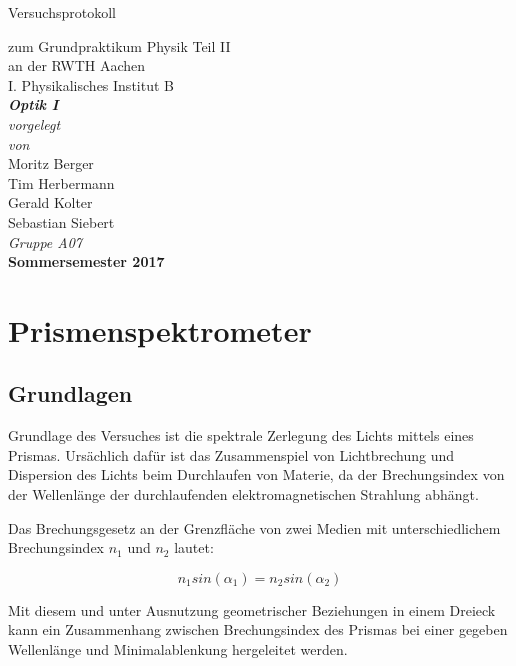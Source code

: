 \documentclass[12pt,a4paper]{article}
\author{Tim}
\begin{document}
	\setlength{\parindent}{0pt} 
	\begin{center}
		{\LARGE Versuchsprotokoll}\\
		\begin{large}
			zum Grundpraktikum Physik Teil II\\[0.4cm]
			an der RWTH Aachen\\
			I. Physikalisches Institut B\\[4.5cm]
			\Large\textbf{\textsl{Optik I}}\\[4cm]
			\normalsize\textit{vorgelegt\\von}\\[0.4cm]
			\large{Moritz Berger\\Tim Herbermann\\Gerald Kolter\\Sebastian Siebert}\\[1cm]
			\large \textit{Gruppe A07} \\ [3cm]
			\large \textbf{Sommersemester 2017}
		\end{large}
	\end{center}
	\newpage
	
	\tableofcontents
	\newpage
	
	\section{Prismenspektrometer}
	
	\subsection{Grundlagen}
	Grundlage des Versuches ist die spektrale Zerlegung des Lichts mittels eines Prismas. Ursächlich dafür ist das Zusammenspiel von Lichtbrechung und Dispersion des Lichts beim Durchlaufen von Materie, da der Brechungsindex von der Wellenlänge der durchlaufenden elektromagnetischen Strahlung abhängt.
	
	Das Brechungsgesetz an der Grenzfläche von zwei Medien mit unterschiedlichem Brechungsindex $n_1$ und $n_2$ lautet:
	
	\begin{equation}
	n_1 sin(\alpha_1) = n_2 sin(\alpha_2)
	\end{equation}
	
	Mit diesem und unter Ausnutzung geometrischer Beziehungen in einem Dreieck kann ein Zusammenhang zwischen Brechungsindex des Prismas bei einer gegeben Wellenlänge und Minimalablenkung hergeleitet werden.
	
\end{document}
